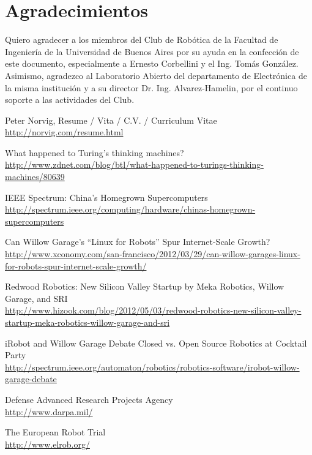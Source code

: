 \documentclass[a4paper,12pt]{article}
\begin{document}
\section{Agradecimientos}

Quiero agradecer a los miembros del  Club de Robótica de la Facultad de Ingeniería de la Universidad de Buenos Aires por su ayuda en la confección de este documento, especialmente a Ernesto Corbellini y el Ing. Tomás González. Asimismo, agradezco al Laboratorio Abierto del departamento de Electrónica de la misma institución y a su director Dr. Ing. Alvarez-Hamelin, por el continuo soporte a las actividades del Club.

\begin{thebibliography}{99}

Peter Norvig, Resume / Vita / C.V. / Curriculum Vitae \\
\url{http://norvig.com/resume.html}

What happened to Turing's thinking machines? \\
\url{http://www.zdnet.com/blog/btl/what-happened-to-turings-thinking-machines/80639}

IEEE Spectrum: China's Homegrown Supercomputers \\
\url{http://spectrum.ieee.org/computing/hardware/chinas-homegrown-supercomputers}

Can Willow Garage’s ``Linux for Robots'' Spur Internet-Scale Growth? \\
\url{http://www.xconomy.com/san-francisco/2012/03/29/can-willow-garages-linux-for-robots-spur-internet-scale-growth/}

Redwood Robotics: New Silicon Valley Startup by Meka Robotics, Willow Garage, and SRI \\
\url{http://www.hizook.com/blog/2012/05/03/redwood-robotics-new-silicon-valley-startup-meka-robotics-willow-garage-and-sri}

iRobot and Willow Garage Debate Closed vs. Open Source Robotics at Cocktail Party \\
\url{http://spectrum.ieee.org/automaton/robotics/robotics-software/irobot-willow-garage-debate}

Defense Advanced Research Projects Agency \\
\url{http://www.darpa.mil/}

The European Robot Trial \\
\url{http://www.elrob.org/}


\end{thebibliography}
\end{document}
